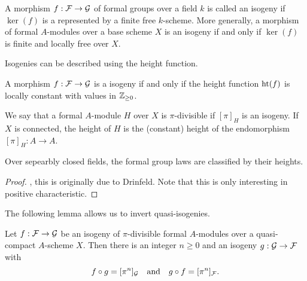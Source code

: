 \begin{defi}[Isogeny]
  A morphism $f: \mathcal{F} \to \mathcal{G}$ of formal groups over a field $k$ is called an isogeny if
  $\ker(f)$ is a represented by a finite free $k$-scheme. More generally, a
  morphism of formal $A$-modules over a base scheme $X$ is an isogeny if and
  only if $\ker(f)$ is finite and locally free over $X$. 
\end{defi}

Isogenies can be described using the height function.

\begin{lem}
  A morphism $f: \mathcal{F} \to \mathcal{G}$ is a isogeny if and only if the height 
  function $\textnormal{ht}(f)$ is locally constant with values in $\mathbb{Z}_{\geq 0}$. 
\end{lem}

\begin{defi}
  We say that a formal $A$-module $H$ over $X$ is $\pi$-divisible if 
  $[\pi]_H$ is an isogeny. If $X$ is connected, the height of $H$ is the
  (constant) height of the endomorphism $[\pi]_H: A \to A$. 
\end{defi}

\begin{lem}
  Over sepearbly closed fields, the formal group laws are classified by their 
  heights.
\begin{proof}
  \cite[Theorem 19.4.1]{hazewinkel1978formal}, this is originally due to Drinfeld.
  Note that this is only interesting in positive characteristic.
\end{proof}
\end{lem}

The following lemma allows us to invert quasi-isogenies.

\begin{lem}
  Let $f: \mathcal{F} \to \mathcal{G}$ be an isogeny of $\pi$-divisible formal $A$-modules over a
  quasi-compact  $A$-scheme $X$. Then there is an 
  integer $n \geq 0$ and an isogeny $g: \mathcal{G} \to \mathcal{F}$ with 
  \begin{equation*}
    f \circ g = [\pi^n]_{\mathcal{G}} \quad \text{and} \quad g \circ f = [\pi^n]_{\mathcal{F}}.
  \end{equation*}
\end{lem}

